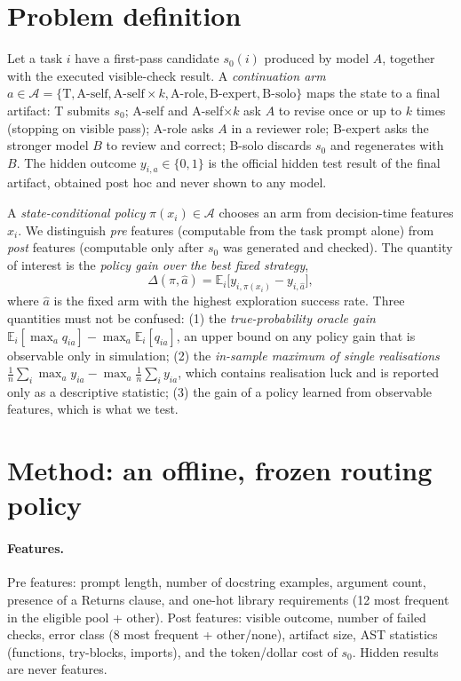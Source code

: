 \documentclass{article}
\newif\ifdraftmode
\newcommand{\draftnote}[1]{\ifdraftmode{\color{red}\textbf{[DRAFT: #1]}}\else\PackageError{main}{draftnote left in submission build: #1}{}\fi}
\begin{document}
\section{Problem definition}
\label{sec:problem}
Let a task $i$ have a first-pass candidate $s_0(i)$ produced by model $A$, together with the executed visible-check result. A
\emph{continuation arm} $a\in\mathcal{A}=\{\text{T},\text{A-self},\text{A-self}{\times}k,\text{A-role},\text{B-expert},\text{B-solo}\}$
maps the state to a final artifact: T submits $s_0$; A-self and A-self${\times}k$ ask $A$ to revise once or up to $k$ times
(stopping on visible pass); A-role asks $A$ in a reviewer role; B-expert asks the stronger model $B$ to review and correct; B-solo
discards $s_0$ and regenerates with $B$. The hidden outcome $y_{i,a}\in\{0,1\}$ is the official hidden test result of the final
artifact, obtained post hoc and never shown to any model.

A \emph{state-conditional policy} $\pi(x_i)\in\mathcal{A}$ chooses an arm from decision-time features $x_i$. We distinguish
\emph{pre} features (computable from the task prompt alone) from \emph{post} features (computable only after $s_0$ was generated and
checked). The quantity of interest is the \emph{policy gain over the best fixed strategy},
\begin{equation}
\Delta(\pi,\hat a)=\mathbb{E}_i\big[y_{i,\pi(x_i)}-y_{i,\hat a}\big],
\end{equation}
where $\hat a$ is the fixed arm with the highest exploration success rate. Three quantities must not be confused: (1) the
\emph{true-probability oracle gain} $\mathbb{E}_i[\max_a q_{ia}]-\max_a\mathbb{E}_i[q_{ia}]$, an upper bound on any policy gain that is
observable only in simulation; (2) the \emph{in-sample maximum of single realisations} $\frac1n\sum_i\max_a y_{ia}-\max_a\frac1n\sum_i y_{ia}$,
which contains realisation luck and is reported only as a descriptive statistic; (3) the gain of a policy learned from observable
features, which is what we test.

\section{Method: an offline, frozen routing policy}
\label{sec:method}
\paragraph{Features.} Pre features: prompt length, number of docstring examples, argument count, presence of a Returns clause, and
one-hot library requirements (12 most frequent in the eligible pool + other). Post features: visible outcome, number of failed checks,
error class (8 most frequent + other/none), artifact size, AST statistics (functions, try-blocks, imports), and the token/dollar cost of
$s_0$. Hidden results are never features. \draftnote{cite features.py version FEATURES\_VERSION=features-i1; list is fixed.}
\end{document}
